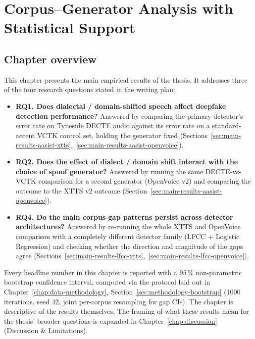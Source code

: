 \cleardoubleoddpage
\chapter{Corpus--Generator Analysis with Statistical Support}
\label{chap:main-results}



\section{Chapter overview}
\label{sec:main-results-overview}

This chapter presents the main empirical results of the thesis. It
addresses three of the four research questions stated in the
writing plan:

\begin{itemize}
    \item \textbf{RQ1. Does dialectal / domain-shifted speech affect deepfake
        detection performance?} Answered by comparing the primary
        detector's error rate on Tyneside DECTE audio against its error
        rate on a standard-accent VCTK control set, holding the generator
        fixed (Sections~\ref{sec:main-results-aasist-xtts},~\ref{sec:main-results-aasist-openvoice}).
    \item \textbf{RQ2. Does the effect of dialect / domain shift interact with
        the choice of spoof generator?} Answered by running the same
        DECTE-vs-VCTK comparison for a second generator (OpenVoice v2)
        and comparing the outcome to the XTTS v2 outcome (Section~\ref{sec:main-results-aasist-openvoice}).
    \item \textbf{RQ4. Do the main corpus-gap patterns persist across detector
        architectures?} Answered by re-running the whole XTTS and
        OpenVoice comparison with a completely different detector family
        (LFCC + Logistic Regression) and checking whether the direction
        and magnitude of the gaps agree (Sections~\ref{sec:main-results-lfcc-xtts},~\ref{sec:main-results-lfcc-openvoice}).
\end{itemize}

Every headline number in this chapter is reported with a 95\,\%
non-parametric bootstrap confidence interval, computed via the
protocol laid out in Chapter~\ref{chap:data-methodology}, Section~\ref{sec:methodology-bootstrap} (1000 iterations,
seed 42, joint per-corpus resampling for gap CIs). The chapter is
descriptive of the results themselves. The framing of what these
results mean for the thesis' broader questions is expanded in
Chapter~\ref{chap:discussion} (Discussion \& Limitations).

